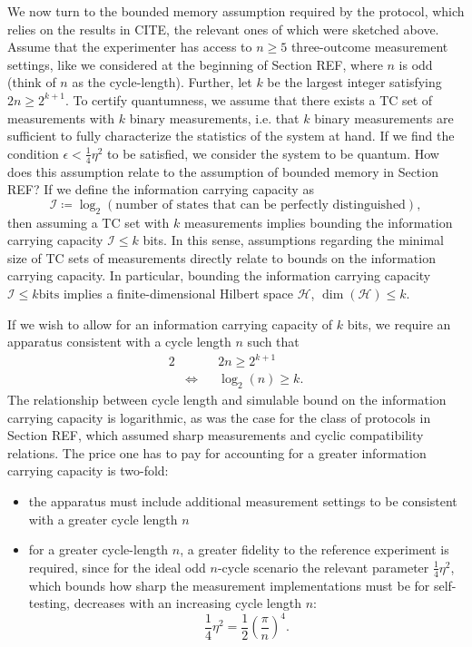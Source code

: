 We now turn to the bounded memory assumption required by the protocol, which relies on the results in CITE, the relevant ones of which were sketched above. Assume that the experimenter has access to $n\geq 5$ three-outcome measurement settings, like we considered at the beginning of Section REF, where $n$ is odd (think of $n$ as the cycle-length). Further, let $k$ be the largest integer satisfying $2n\geq 2^{k+1}$. To certify quantumness, we assume that there exists a TC set of measurements with $k$ binary measurements, i.e. that $k$ binary measurements are sufficient to fully characterize the statistics of the system at hand. If we find the condition $\epsilon<\frac{1}{4}\eta^2$ to be satisfied, we consider the system to be quantum.  How does this assumption relate to the assumption of bounded memory in Section REF? If we define the information carrying capacity as 
\begin{equation}
\mathcal{I}\coloneqq \log_2(\text{number of states that can be perfectly distinguished}),
\end{equation}
then assuming a TC set with $k$ measurements implies bounding the information carrying capacity $\mathcal{I}\leq k$ bits. In this sense, assumptions regarding the minimal size of TC sets of measurements directly relate to bounds on the information carrying capacity. In particular, bounding the information carrying capacity $\mathcal{I}\leq k \text{bits}$ implies a finite-dimensional Hilbert space $\mathcal{H}$, $\operatorname{dim}(\mathcal{H})\leq k$.

If we wish to allow for an information carrying capacity of $k$ bits, we require an apparatus consistent with a cycle length $n$ such that
\begin{alignat}{2}
& && 2n\geq 2^{k+1} \\
& \iff && \log_2(n)\geq k.
\end{alignat}
The relationship between cycle length and simulable bound on the information carrying capacity is logarithmic, as was the case for the class of protocols in Section REF, which assumed sharp measurements and cyclic compatibility relations. The price one has to pay for accounting for a greater information carrying capacity is two-fold:
\begin{itemize}
\item the apparatus must include additional measurement settings to be consistent with a greater cycle length $n$
\item for a greater cycle-length $n$, a greater fidelity to the reference experiment is required, since for the ideal odd $n$-cycle scenario the relevant parameter $\frac{1}{4}\eta^2$, which bounds how sharp the measurement implementations must be for self-testing, decreases with an increasing cycle length $n$:
\begin{equation}
\frac{1}{4}\eta^2 = \frac{1}{2}(\frac{\pi}{n})^4.
\end{equation}
\end{itemize}

